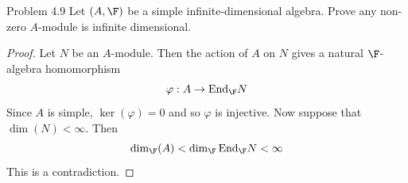 \documentclass[a4paper]{article}
\begin{document}
\begin{ex}{Problem 4.9}{} Let $(A,\F)$ be a simple infinite-dimensional algebra. Prove any non-zero $A$-module is infinite dimensional. 
\begin{proof}
Let $N$ be an $A$-module. Then the action of $A$ on $N$ gives a natural $\F$-algebra homomorphism $$\varphi:A\to\text{End}_\F N$$ Since $A$ is simple, $\ker(\varphi)=0$ and so $\varphi$ is injective. Now suppose that $\dim(N)<\infty$. Then $$\dim_\F(A)<\dim_\F\text{End}_\F N<\infty$$ This is a contradiction. 
\end{proof}
\end{ex}
\end{document}
